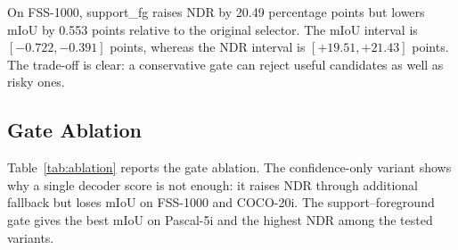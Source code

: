 \documentclass{CVM}
\begin{document}
On FSS-1000, support\_fg raises NDR by 20.49 percentage points but lowers mIoU by 0.553 points relative to the original selector. The mIoU interval is $[-0.722,-0.391]$ points, whereas the NDR interval is $[+19.51,+21.43]$ points. The trade-off is clear: a conservative gate can reject useful candidates as well as risky ones.

\subsection{Gate Ablation}
\label{sec:gate_ablation}

Table~\ref{tab:ablation} reports the gate ablation. The confidence-only variant shows why a single decoder score is not enough: it raises NDR through additional fallback but loses mIoU on FSS-1000 and COCO-20i. The support--foreground gate gives the best mIoU on Pascal-5i and the highest NDR among the tested variants.
\end{document}
